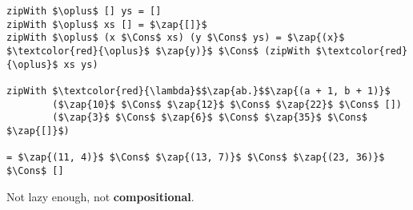 \begin{frame}[t,fragile]
\vspace{35pt}


\begin{lstlisting}[mathescape=true,numbers=none]
zipWith $\oplus$ [] ys = []
zipWith $\oplus$ xs [] = $\zap{[]}$
zipWith $\oplus$ (x $\Cons$ xs) (y $\Cons$ ys) = $\zap{(x}$ $\textcolor{red}{\oplus}$ $\zap{y)}$ $\Cons$ (zipWith $\textcolor{red}{\oplus}$ xs ys)

zipWith $\textcolor{red}{\lambda}$$\zap{ab.}$$\zap{(a + 1, b + 1)}$
        ($\zap{10}$ $\Cons$ $\zap{12}$ $\Cons$ $\zap{22}$ $\Cons$ [])
        ($\zap{3}$ $\Cons$ $\zap{6}$ $\Cons$ $\zap{35}$ $\Cons$ $\zap{[]}$)

= $\zap{(11, 4)}$ $\Cons$ $\zap{(13, 7)}$ $\Cons$ $\zap{(23, 36)}$ $\Cons$ []
\end{lstlisting}

\vspace{5pt}
Not lazy enough, not \textbf{compositional}.

\end{frame}
